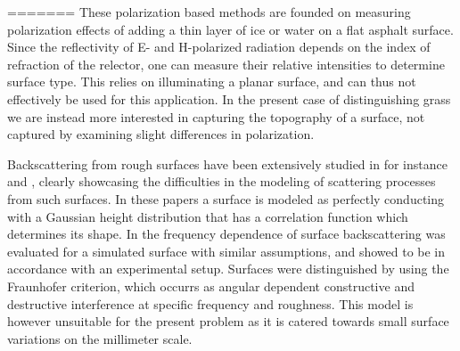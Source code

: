 =======
These polarization based methods are founded on measuring polarization effects of adding a thin layer of ice or water on a flat asphalt surface. Since the reflectivity of E- and H-polarized radiation depends on the index of refraction of the relector, one can measure their relative intensities to determine surface type. This relies on illuminating a planar surface, and can thus not effectively be used for this application. In the present case of distinguishing grass we are instead more interested in capturing the topography of a surface, not captured by examining slight differences in polarization.

Backscattering from rough surfaces have been extensively studied in for instance \citep{fung_pan_1987} and \citep{fung_li_chen_1992}, clearly showcasing the difficulties in the modeling of scattering processes from such surfaces. In these papers a surface is modeled as perfectly conducting with a Gaussian height distribution that has a correlation function which determines its shape. In \citep{scharf_iberle_mantz_walter_waldschrnidt_2018} the frequency dependence of surface backscattering was evaluated for a simulated surface with similar assumptions, and showed to be in accordance with an experimental setup. Surfaces were distinguished by using the Fraunhofer criterion, which occurrs as angular dependent constructive and destructive interference at specific frequency and roughness. This model is however unsuitable for the present problem as it is catered towards small surface variations on the millimeter scale.  


